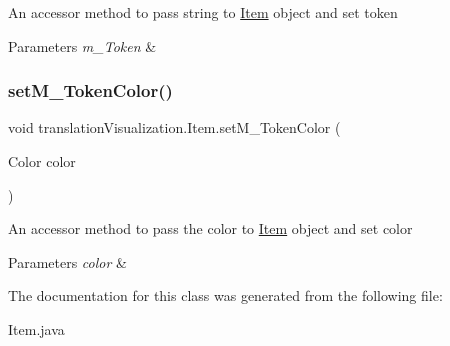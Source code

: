 An accessor method to pass string to \hyperlink{classtranslation_visualization_1_1_item}{Item} object and set token 
\begin{DoxyParams}{Parameters}
{\em m\+\_\+\+Token} & \\
\hline
\end{DoxyParams}
\mbox{\label{classtranslation_visualization_1_1_item_a3fcd8e191d44eb3fc2762172b1075514}} 
\subsubsection{\texorpdfstring{set\+M\+\_\+\+Token\+Color()}{setM\_TokenColor()}}
{\footnotesize\ttfamily void translation\+Visualization.\+Item.\+set\+M\+\_\+\+Token\+Color (\begin{DoxyParamCaption}\item[{Color}]{color }\end{DoxyParamCaption})\hspace{0.3cm}{\ttfamily [inline]}}

An accessor method to pass the color to \hyperlink{classtranslation_visualization_1_1_item}{Item} object and set color 
\begin{DoxyParams}{Parameters}
{\em color} & \\
\hline
\end{DoxyParams}


The documentation for this class was generated from the following file\+:\begin{DoxyCompactItemize}
\item 
Item.\+java\end{DoxyCompactItemize}
